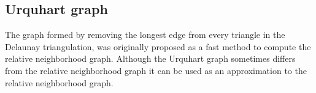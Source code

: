 \documentclass[10pt]{article}
\begin{document}
\subsection{Urquhart graph}
The graph formed by removing the longest edge from every triangle in the Delaunay triangulation, was originally proposed as a fast method to compute the relative neighborhood graph. Although the Urquhart graph sometimes differs from the relative neighborhood graph it can be used as an approximation to the relative neighborhood graph.

\begin{thebibliography}{1}



\end{thebibliography}
\end{document}
